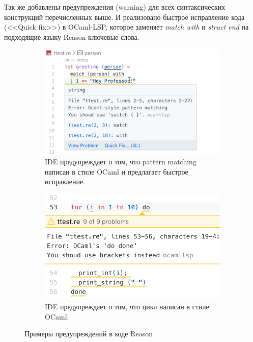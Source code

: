 Так же добавлены предупреждения (warning) для всех синтаксических конструкций перечисленных выше. И реализовано быстрое исправление кода (<<Quick fix>>) в OCaml-LSP, которое заменяет {\it match with} и {\it struct end} на подходящие языку Reason ключевые слова.
\begin{figure}[h]
	\begin{subfigure}[t]{0.5\textwidth}
		\includegraphics[width=\linewidth]{screenshots/05.png}
		\caption{IDE предупреждает о том, что pattern matching написан в стиле OCaml и \newline предлагает быстрое исправление.}
	\end{subfigure}
	\begin{subfigure}[t]{0.5\textwidth}
		\includegraphics[width=\linewidth]{screenshots/06.png}
		\caption{IDE предупреждает о том, что цикл написан в стиле OCaml.}
	\end{subfigure}
\caption{Примеры предупреждений в коде Reason}
\end{figure}
\newpage
